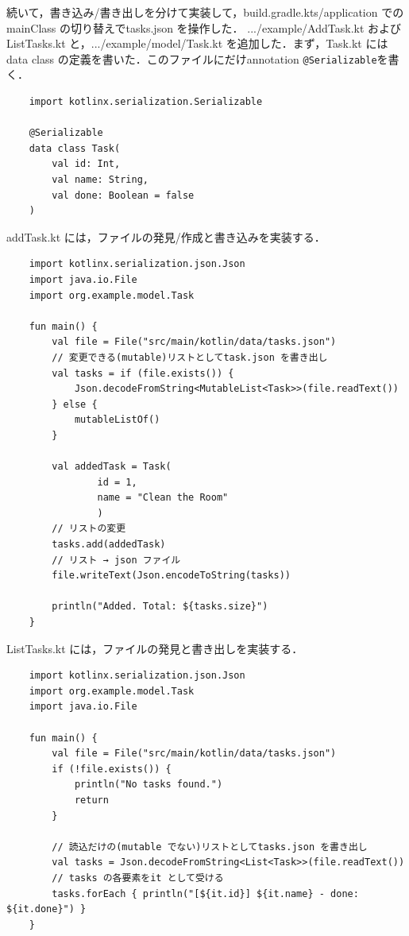 \documentclass{ltjsarticle}
\begin{document}
続いて，書き込み/書き出しを分けて実装して，build.gradle.kts/application でのmainClass の切り替えでtasks.json を操作した．
.../example/AddTask.kt およびListTasks.kt と，.../example/model/Task.kt を追加した．まず，Task.kt にはdata class の定義を書いた．このファイルにだけannotation \texttt{@Serializable}を書く．
\begin{verbatim}
    import kotlinx.serialization.Serializable

    @Serializable
    data class Task(
        val id: Int,
        val name: String,
        val done: Boolean = false
    )
\end{verbatim}
addTask.kt には，ファイルの発見/作成と書き込みを実装する．
\begin{verbatim}
    import kotlinx.serialization.json.Json
    import java.io.File
    import org.example.model.Task

    fun main() {
        val file = File("src/main/kotlin/data/tasks.json")
        // 変更できる(mutable)リストとしてtask.json を書き出し
        val tasks = if (file.exists()) {
            Json.decodeFromString<MutableList<Task>>(file.readText())
        } else {
            mutableListOf()
        }

        val addedTask = Task(
                id = 1,
                name = "Clean the Room"
                )
        // リストの変更
        tasks.add(addedTask)
        // リスト → json ファイル
        file.writeText(Json.encodeToString(tasks))

        println("Added. Total: ${tasks.size}")
    }
\end{verbatim}

ListTasks.kt には，ファイルの発見と書き出しを実装する．
\begin{verbatim}
    import kotlinx.serialization.json.Json
    import org.example.model.Task
    import java.io.File

    fun main() {
        val file = File("src/main/kotlin/data/tasks.json")
        if (!file.exists()) {
            println("No tasks found.")
            return
        }

        // 読込だけの(mutable でない)リストとしてtasks.json を書き出し
        val tasks = Json.decodeFromString<List<Task>>(file.readText())
        // tasks の各要素をit として受ける
        tasks.forEach { println("[${it.id}] ${it.name} - done: ${it.done}") }
    }
\end{verbatim}
\end{document}
